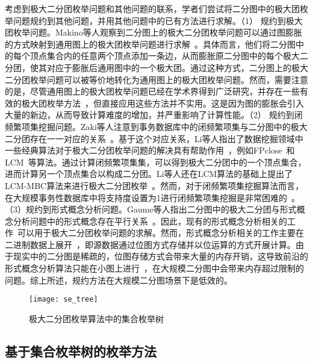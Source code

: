 考虑到极大二分团枚举问题和其他问题的联系，学者们尝试将二分图中的极大团枚举问题规约到其他问题，并用其他问题中的已有方法进行求解。（1） 规约到极大团枚举问题。Makino等人观察到二分图上的极大二分团枚举问题可以通过图膨胀的方式映射到通用图上的极大团枚举问题进行求解~\cite{Makino04}。具体而言，他们将二分图中的每个顶点集合内的任意两个顶点添加一条边，从而膨胀原二分图中的每个极大二分团，使其对应于膨胀后通用图中的一个极大团。通过这种方式，二分图上的极大二分团枚举问题可以被等价地转化为通用图上的极大团枚举问题。然而，需要注意的是，尽管通用图上的极大团枚举问题已经在学术界得到广泛研究，并存在一些有效的极大团枚举方法~\cite{MCEparallel20,MCE20,MCE22,MCE-GPU21,MCE-22}，但直接应用这些方法并不实用。这是因为图的膨胀会引入大量的新边，从而导致计算难度的增加，并严重影响了计算性能。（2） 规约到闭频繁项集挖掘问题。Zaki等人注意到事务数据库中的闭频繁项集与二分图中的极大二分团存在一一对应的关系~\cite{FCIM98}。基于这个对应关系，Li等人指出了数据挖掘领域中一些经典算法对于极大二分团枚举问题的解决具有帮助作用~\cite{correspondence05}，例如FPclose~\cite{fpclose04}和LCM~\cite{lcm04}等算法。通过计算闭频繁项集集，可以得到极大二分团中的一个顶点集合，进而计算另一个顶点集合以构成二分团。Li等人还在LCM算法的基础上提出了LCM-MBC算法来进行极大二分团枚举~\cite{lcmmbc07}。然而，对于闭频繁项集挖掘算法而言，在大规模事务性数据库中将支持度设置为1进行闭频繁项集挖掘是非常困难的~\cite{iMBEA14}。（3）规约到形式概念分析问题。Gaume等人指出二分图中的极大二分团与形式概念分析问题中的形式概念存在平行关系~\cite{fcambe10}。因此，现有的形式概念分析相关的工作~\cite{FCA15,FCA21,FCA22}可以用于极大二分团枚举问题的求解。然而，形式概念分析相关的工作主要在二进制数据上展开~\cite{FCA15}，即源数据通过位图方式存储并以位运算的方式开展计算。由于现实中的二分图是稀疏的，位图存储方式会带来大量的内存开销，这导致前沿的形式概念分析算法只能在小图上进行~\cite{FCA21,FCA22}，在大规模二分图中会带来内存超过限制的问题。综上所述，规约方法在大规模二分图场景下是低效的。

\begin{figure} [t]
  \centering
  \texttt{[image: se\_tree]}
  \caption{极大二分团枚举算法中的集合枚举树}
  \label{fig:se}

\end{figure}

\subsection{基于集合枚举树的枚举方法}

